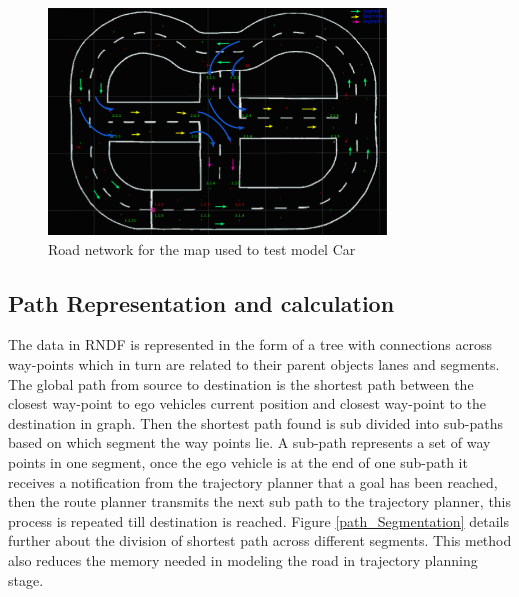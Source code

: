 \begin{figure}
    \centering
    \includegraphics[width=0.8\textwidth]{Images/map_rndf.png}
    \caption{Road network for the map used to test model Car}
    \label{map_rndf}
\end{figure}



\subsection{Path Representation and calculation}

The data in RNDF is represented in the form of a tree with connections across way-points which in turn are related to their parent objects lanes and segments. The global path from source to destination is the shortest path between the closest way-point to ego vehicles current position and closest way-point to the destination in graph. Then the shortest path found is sub divided into sub-paths based on which segment the way points lie. A sub-path represents a set of way points in one segment, once the ego vehicle is at the end of one sub-path it receives a notification from the trajectory planner that a goal has been reached, then the route planner transmits the next sub path to the trajectory planner, this process is repeated till destination is reached. Figure \ref{path_Segmentation} details further about the division of shortest path across different segments. This method also reduces the memory needed in modeling the road in trajectory planning stage.

